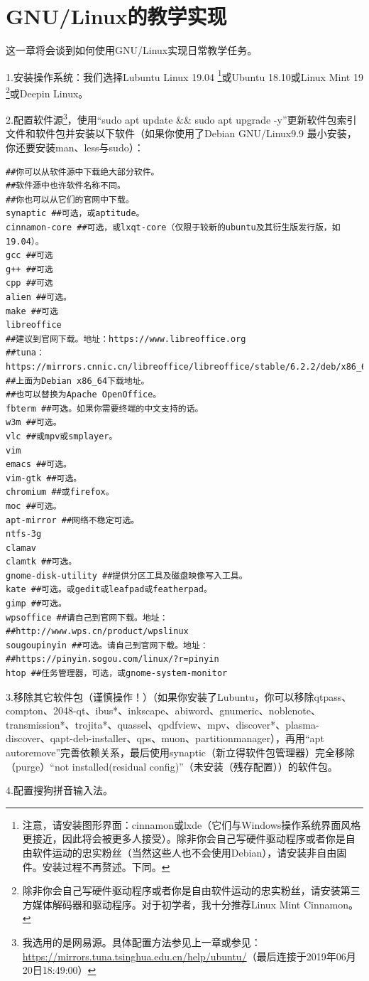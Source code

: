 \documentclass{book}
\begin{document}
\section{GNU/Linux的教学实现}
这一章将会谈到如何使用GNU/Linux实现日常教学任务。\par
1.安装操作系统：我们选择Lubuntu Linux 19.04 \footnote{注意，请安装图形界面：cinnamon或lxde（它们与Windows操作系统界面风格更接近，因此将会被更多人接受）。除非你会自己写硬件驱动程序或者你是自由软件运动的忠实粉丝（当然这些人也不会使用Debian），请安装非自由固件。安装过程不再赘述。下同。}或Ubuntu 18.10或Linux Mint 19 \footnote{除非你会自己写硬件驱动程序或者你是自由软件运动的忠实粉丝，请安装第三方媒体解码器和驱动程序。对于初学者，我十分推荐Linux Mint Cinnamon。}或Deepin Linux。 \par
2.配置软件源\footnote{我选用的是网易源。具体配置方法参见上一章或参见：\url{https://mirrors.tuna.tsinghua.edu.cn/help/ubuntu/}（最后连接于2019年06月20日18:49:00）}，使用“sudo apt update \&\& sudo apt upgrade -y”更新软件包索引文件和软件包并安装以下软件（如果你使用了Debian GNU/Linux9.9 最小安装，你还要安装man、less与sudo）：
\begin{verbatim}
##你可以从软件源中下载绝大部分软件。
##软件源中也许软件名称不同。
##你也可以从它们的官网中下载。
synaptic ##可选，或aptitude。
cinnamon-core ##可选，或lxqt-core（仅限于较新的ubuntu及其衍生版发行版，如19.04）。
gcc ##可选
g++ ##可选
cpp ##可选
alien ##可选。
make ##可选
libreoffice
##建议到官网下载。地址：https://www.libreoffice.org
##tuna：https://mirrors.cnnic.cn/libreoffice/libreoffice/stable/6.2.2/deb/x86_64/
##上面为Debian x86_64下载地址。
##也可以替换为Apache OpenOffice。
fbterm ##可选。如果你需要终端的中文支持的话。
w3m ##可选。
vlc ##或mpv或smplayer。
vim
emacs ##可选。
vim-gtk ##可选。
chromium ##或firefox。
moc ##可选。
apt-mirror ##网络不稳定可选。
ntfs-3g
clamav
clamtk ##可选。
gnome-disk-utility ##提供分区工具及磁盘映像写入工具。
kate ##可选。或gedit或leafpad或featherpad。
gimp ##可选。
wpsoffice ##请自己到官网下载。地址：
##http://www.wps.cn/product/wpslinux
sougoupinyin ##可选。请自己到官网下载。地址：
##https://pinyin.sogou.com/linux/?r=pinyin
htop ##任务管理器，可选，或gnome-system-monitor
\end{verbatim}
3.移除其它软件包（谨慎操作！）（如果你安装了Lubuntu，你可以移除qtpass、compton、2048-qt、ibus*、inkscape、abiword、gnumeric、noblenote、transmission*、trojita*、quassel、qpdfview、mpv、discover*、plasma-discover、qapt-deb-installer、qps、muon、partitionmanager），再用“apt autoremove”完善依赖关系，最后使用synaptic（新立得软件包管理器）完全移除（purge）“not installed(residual config)”（未安装（残存配置））的软件包。\par
4.配置搜狗拼音输入法。
\end{document}
